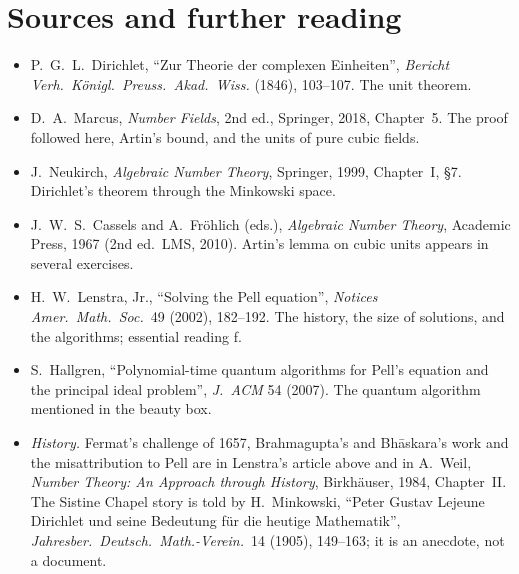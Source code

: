 \section*{Sources and further reading}

\begin{itemize}
\item P.~G.~L.~Dirichlet, ``Zur Theorie der complexen Einheiten'', \emph{Bericht Verh.\ K\"onigl.\ Preuss.\ Akad.\ Wiss.}
(1846), 103--107. The unit theorem.
\item D.~A.~Marcus, \emph{Number Fields}, 2nd ed., Springer, 2018, Chapter~5. The proof followed here, Artin's bound, and the
units of pure cubic fields.
\item J.~Neukirch, \emph{Algebraic Number Theory}, Springer, 1999, Chapter~I, \S7. Dirichlet's theorem through the
Minkowski space.
\item J.~W.~S.~Cassels and A.~Fr\"ohlich (eds.), \emph{Algebraic Number Theory}, Academic Press, 1967 (2nd ed.\ LMS, 2010).
Artin's lemma on cubic units appears in several exercises.
\item H.~W.~Lenstra, Jr., ``Solving the Pell equation'', \emph{Notices Amer.\ Math.\ Soc.}\ 49 (2002), 182--192. The history,
the size of solutions, and the algorithms; essential reading f.
\item S.~Hallgren, ``Polynomial-time quantum algorithms for Pell's equation and the principal ideal problem'', \emph{J.\ ACM}
54 (2007). The quantum algorithm mentioned in the beauty box.
\item \emph{History.} Fermat's challenge of 1657, Brahmagupta's and Bh\=askara's work and the misattribution to Pell are
in Lenstra's article above and in A.~Weil, \emph{Number Theory: An Approach through History}, Birkh\"auser, 1984, Chapter~II.
The Sistine Chapel story is told by H.~Minkowski, ``Peter Gustav Lejeune Dirichlet und seine Bedeutung f\"ur die heutige
Mathematik'', \emph{Jahresber.\ Deutsch.\ Math.-Verein.}\ 14 (1905), 149--163; it is an anecdote, not a document.
\end{itemize}
